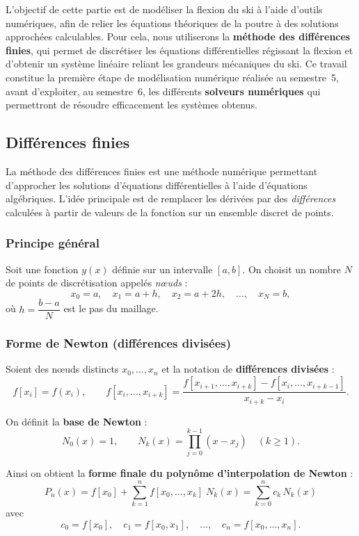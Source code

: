 \documentclass[12pt, a4paper]{article}
\begin{document}
L’objectif de cette partie est de modéliser la flexion du ski à l’aide d’outils numériques, afin de relier les équations théoriques de la poutre à des solutions approchées calculables.  
Pour cela, nous utiliserons la \textbf{méthode des différences finies}, qui permet de discrétiser les équations différentielles régissant la flexion et d’obtenir un système linéaire reliant les grandeurs mécaniques du ski.  
Ce travail constitue la première étape de modélisation numérique réalisée au semestre~5, avant d’exploiter, au semestre~6, les différents \textbf{solveurs numériques} qui permettront de résoudre efficacement les systèmes obtenus.

\subsection{Différences finies}

La méthode des différences finies est une méthode numérique permettant d'approcher
les solutions d'équations différentielles à l'aide d'équations algébriques.
L'idée principale est de remplacer les dérivées par des \textit{différences}
calculées à partir de valeurs de la fonction sur un ensemble discret de points.

\subsubsection{Principe général}

Soit une fonction $y(x)$ définie sur un intervalle $[a,b]$.
On choisit un nombre $N$ de points de discrétisation appelés \textit{nœuds} :
\[
x_0 = a,\quad x_1 = a + h,\quad x_2 = a + 2h,\quad \dots,\quad x_N = b,
\]
où $h = \dfrac{b - a}{N}$ est le pas du maillage.

\subsubsection{Forme de Newton (différences divisées)}

Soient des n\oe{}uds distincts $x_0,\dots,x_n$ et la notation de \textbf{différences divisées} :
\[
f[x_i] = f(x_i),\qquad
f[x_i,\dots,x_{i+k}] = \frac{f[x_{i+1},\dots,x_{i+k}] - f[x_i,\dots,x_{i+k-1}]}{x_{i+k}-x_i}.
\]

On définit la \textbf{base de Newton} :
\[
N_0(x)=1,\qquad
N_k(x)=\prod_{j=0}^{k-1}(x-x_j)\quad (k\ge 1).
\]

Ainsi on obtient la \textbf{forme finale du polynôme d'interpolation de Newton} :
\[
\boxed{
P_n(x)= f[x_0] + \sum_{k=1}^{n} f[x_0,\dots,x_k]\; N_k(x)
= \sum_{k=0}^{n} c_k\,N_k(x)
}
\]
avec 
\[
c_0=f[x_0],\quad c_1=f[x_0,x_1],\quad \dots,\quad c_n=f[x_0,\dots,x_n].
\]
\end{document}
